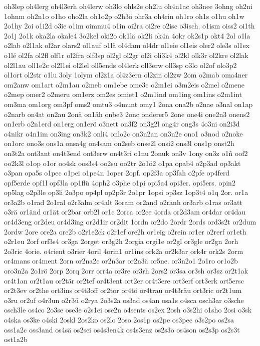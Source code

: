 {oh3lep
oh4lerg
oh4l3erh
oh4lerw
oh3lo
ohls2e
oh2lu
oh4n1ac
oh3nee
3ohng
oh2ni
1ohnm
oh2n1o
o1ho
oho2la
oh1o2p
o2h3ö
ohr3a
oh4rin
oh1ro
oh1s
o1hu
oh1w
2o1hy
2oi
o1i2d
o3ie
o1im
oimmu4
o1in
oi2ra
oi2re
o2isc
o3isch.
o1ism
oiss2
oi1th
2o1j
2o1k
oka2la
okale4
3o2kel
oki2o
ok1lä
ok2li
ok4n
4okr
ok2s1p
okt4
2ol
o1la
o2lab
o2l1ak
ol2ar
olars2
ol1auf
o1lä
ol4dam
ol4dr
ol1eie
ol1eis
oler2
ole3s
ol1ex
o1lé
ol2fa
ol2fl
olf1r
ol2fra
olf3sp
ol2gl
ol2gr
ol2i
oli3k4
ol2kl
olk3r
ol2kre
ol2lak
ol2l1au
oll1e2c
ol2l1ei
ol2lel
oll5ends
ol4lerk
oll3erw
oll3sp
o3lo
ol2of
olo3p2
ol1ort
ol2str
o1lu
3oly
1olym
ol2z1a
ol4z3ern
ol2zin
ol2zw
2om
o2mab
oma4ner
om2anw
om1art
o2m1au
o2meb
om1ebe
ome3c
o2m1ei
o3m2eis
o2mel
o2mene
o2mep
omer2
o2meru
om1erz
om2es
omiet1
o2m1ind
om1ing
om1ins
o2m1int
om3ma
om1org
om3pf
oms2
omtu3
o4munt
omy1
2ona
ona2b
o2nae
o3nal
on1ap
o2narb
on4at
on2au
2onä
on1äh
onbe3
2onc
onderer5
2one
one4i
one2n3
onens2
on1erb
o2n1erd
on1erg
on1erö
o3nett
on3f2
on3g2l
ong4r
ong3s
4o3ni
on2i3d
o4nikr
o4n1im
on3ing
on3k2
onli4
onlo2c
on3n2an
on3n2e
ono1
o3nod
o2noke
on1orc
ono3s
ons1a
onsa4g
on4sam
on2seb
onse2l
onsi2
ons3l
ons1p
onst2h
on3t2a
ont3ant
on4t3end
ont3erw
on4t3ri
o1nu
2onuk
on3v
1ony
on3z
o1ñ
oof2
oo2k3l
o1op
o1or
oo4sk
oos3s4
oo2su
oo2tr
2o1ö2
o1pa
opab4
o2p3ad
op3akt
o3pan
opa5s
o1pec
o1pei
o1pe4n
1oper
2opf.
op2f3a
op3fah
o2pfe
op4ferd
opf5erde
opf1l
opf3la
op1flü
4oph2
o3phe
o1pi
opi5a4
opi3er.
opi5ers.
opin2
op5lag
o2p3le
op3li
2o3po
op4pl
op2p3r
2o1pr
1opsi
op3sz
1op3t4
o1q
2or.
or1a
or3a2b
o1rad
2o1ral
o2r3alm
or4alt
3oram
or2and
o2ranh
or3arb
o1ras
or3att
o3rä
or1änd
or1ät
or2bar
orb2l
or1c
2orca
or2ce
4orda
or2d3am
or4dar
or4dau
or4d3eng
or2deu
or4d3ing
or2d1ir
or2dit
1ordn
or2do
2ordr
2ords
ord3s2t
or2dum
2ordw
2ore
ore2a
ore2b
o2r1e2ck
o2r1ef
ore2h
or1eig
o2rein
or1er
o2rerf
or1eth
o2r1eu
2orf
orf3s4
or3ga
2orget
or3g2h
2orgia
orgi1e
or2gl
or3gle
or2gn
2orh
2o3ric
4orie.
o4rient
o3rier
4oril
4orin1
or1ins
ork2a
or2k3ar
ork4r
ork2s
2orm
or4mans
or4ment
2orn
or2na2c
or2n3ar
or2n3ä
or5ne.
or3n2o1
2o1ro
or1o2b
oro3n2a
2o1rö
2orp
2orq
2orr
orr4a
or3re
or3rh
2ors2
or3sa
or3sh
or3sz
or2t1ak
or4t1an
or2t1au
or2tär
or2tef
or4t3ent
ort2er
or4t3ere
ort3erf
ort3erk
ort5ersc
or2t3ev
or2the
ort3ins
or4t3off
or2tor
or4tö
or4trau
or4t3räu
ort3ric
or2t1um
o3ru
or2uf
o4r3un
o2r3ü
o2rya
2o3s2a
os3ad
os4an
osa1s
o4sca
osch3ar
o3sche
osch3le
os4co
2o3se
ose3e
o2s1ei
ose2n
o4sents
os2ex
2osh
o3s2hi
o1sho
2osi
o3sk
o4ska
os3ke
o4ski
2oskl
2os2ko
os2lo
2oso
2os1p
os2pe
os3pec
o3s2po
os2sa
oss1a2c
oss3and
os4sä
os2sei
os4s3en4k
os4s3enz
os2s3o
os4son
os2s3p
os2s3t
ost1a2b
}
